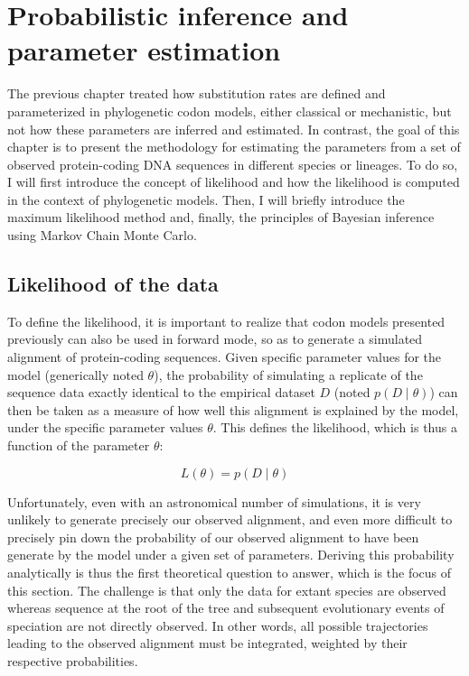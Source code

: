 \chapter{Probabilistic inference and parameter estimation}
{\hypersetup{linkcolor=GREYDARK}\minitoc}
\label{chap:intro-inference}

The previous chapter treated how substitution rates are defined and parameterized in phylogenetic codon models, either classical or mechanistic, but not how these parameters are inferred and estimated.
In contrast, the goal of this chapter is to present the methodology for estimating the parameters from a set of observed protein-coding DNA sequences in different species or lineages.
To do so, I will first introduce the concept of likelihood and how the likelihood is computed in the context of phylogenetic models.
Then, I will briefly introduce the maximum likelihood method and, finally, the principles of Bayesian inference using Markov Chain Monte Carlo.


\section{Likelihood of the data}
\label{sec-intro:likelihood}

To define the likelihood, it is important to realize that codon models presented previously can also be used in forward mode, so as to generate a simulated alignment of protein-coding sequences.
Given specific parameter values for the model (generically noted $\theta$), the probability of simulating a replicate of the sequence data exactly identical to the empirical dataset $D$ (noted $p(D \mid \theta)$) can then be taken as a measure of how well this alignment is explained by the model, under the specific parameter values $\theta$.
This defines the likelihood, which is thus a function of the parameter $\theta$:

\begin{equation}
    L(\theta) = p(D \mid \theta)
\end{equation}

Unfortunately, even with an astronomical number of simulations, it is very unlikely to generate precisely our observed alignment, and even more difficult to precisely pin down the probability of our observed alignment to have been generate by the model under a given set of parameters.
Deriving this probability analytically is thus the first theoretical question to answer, which is the focus of this section.
The challenge is that only the data for extant species are observed whereas sequence at the root of the tree and subsequent evolutionary events of speciation are not directly observed.
In other words, all possible trajectories leading to the observed alignment must be integrated, weighted by their respective probabilities.

